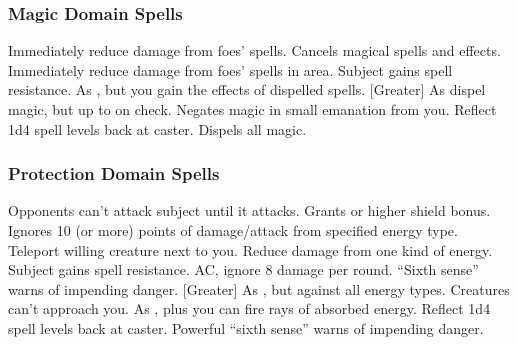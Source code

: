 \subsubsection{Magic Domain Spells}

\begin{spelllist}
     Immediately reduce damage from foes' spells.
    \spellhead[1]{}
    \spellhead[2]{}
    \spellhead[2]{}
     Cancels magical spells and effects.
     Immediately reduce damage from foes' spells in area.
    \spellhead[4]{}
     Subject gains spell resistance.
    \spellhead[5]{}
     As , but you gain the effects of dispelled spells.
    \spellhead[6]{}
    [Greater] As dispel magic, but up to  on check.
     Negates magic in small emanation from you.
     Reflect 1d4 spell levels back at caster.
    \spellhead[8]{}
    \spellhead[8]{}
     Dispels all magic.
    \spellhead[9]{}
\end{spelllist}

\subsubsection{Protection Domain Spells}

\begin{spelllist}
     Opponents can't attack subject until it attacks.
     Grants  or higher shield bonus.
     Ignores 10 (or more) points of damage/attack from specified energy type.
     Teleport willing creature next to you.
     Reduce damage from one kind of energy.
    \spellhead[3]{}
     Subject gains spell resistance.
      AC, ignore 8 damage per round.
    \spellhead[5]{}
     ``Sixth sense'' warns of impending danger.
    [Greater] As , but against all energy types.
     Creatures can't approach you.
     As , plus you can fire rays of absorbed energy.
     Reflect 1d4 spell levels back at caster.
    \spellhead[8]{}
    \spellhead[8]{}
     Powerful ``sixth sense'' warns of impending danger.
    \spellhead[9]{}
\end{spelllist}

